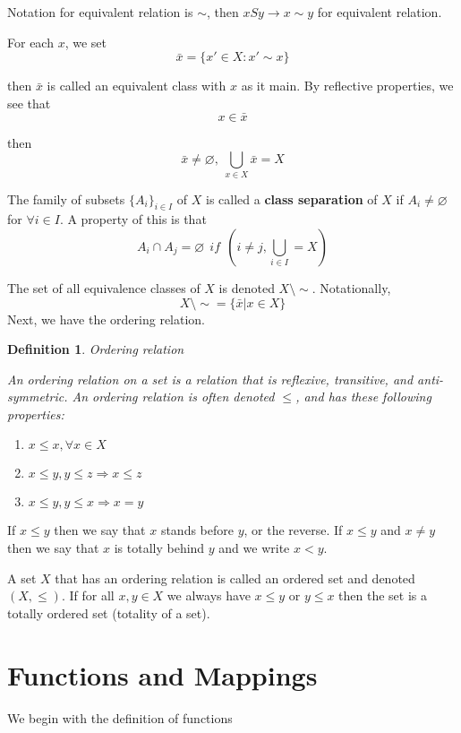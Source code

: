 \documentclass{book}
\newtheorem{Definition}{Definition}[section]
\numberwithin{identity}{subsection}
\numberwithin{Rule}{subsection}
\numberwithin{Theorem}{subsection}
\numberwithin{Definition}{subsection}
\begin{document}
Notation for equivalent relation is $\sim$, then $xSy \rightarrow x \sim y$ for equivalent relation.

For each $x$, we set $$\bar{x}=\{x' \in X: x' \sim x \}$$

then $\bar{x}$ is called an equivalent class with $x$ as it main. By reflective properties, we see that $$x \in \bar{x}$$

then $$\bar{x} \neq \varnothing,\: \bigcup_{x \in X} \bar{x}=X$$

The family of subsets $\{A_{i}\}_{i \in I}$ of $X$ is called a \textbf{class separation} of $X$ if $A_{i}\neq \varnothing$ for $\forall i \in I$. A property of this is that $$A_{i}\cap A_{j}=\varnothing\:\: if\:\: \left(i \neq j, \bigcup_{i \in I} = X\right) $$

The set of all equivalence classes of $X$ is denoted $X \setminus \sim$. Notationally, $$X\setminus \sim = \{\bar{x}| x \in X\}$$
\vspace{5mm}
Next, we have the ordering relation. 

\begin{Definition} Ordering relation

    An ordering relation on a set is a relation that is reflexive, transitive, and anti-symmetric.
An ordering relation is often denoted $\leq$, and has these following properties:
\begin{enumerate}
    \item $x \leq x, \forall x \in X$
    \item $x\leq y, y \leq z \Rightarrow x \leq z$
    \item $x \leq y, y \leq x \Rightarrow x = y$
\end{enumerate}
\end{Definition}

If $x \leq y$ then we say that $x$ stands before $y$, or the reverse. If $x \leq y$ and $x \neq y$ then we say that $x$ is totally behind $y$ and we write $x < y$. 

A set $X$ that has an ordering relation is called an ordered set and denoted $(X, \leq)$. If for all $x,y \in X$ we always have $x \leq y$ or $y \leq x$ then the set is a totally ordered set (totality of a set).

\section{Functions and Mappings}

We begin with the definition of functions
\end{document}
